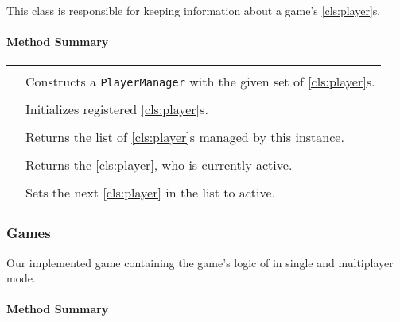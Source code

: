 \pagebreak

This class is responsible for keeping information about a game's \ref{cls:player}s.  \\

\centerdash

\paragraph*{Method Summary}
\paragraph*{}
\begin{longtable}{Lp{10cm}}
	\startmethodtable
	 \\
	& Constructs a \texttt{PlayerManager} with the given set of \ref{cls:player}s. \\
	 \\
	& Initializes registered \ref{cls:player}s. \\
	 \\
	& Returns the list of \ref{cls:player}s managed by this instance. \\
	 \\
	& Returns the \ref{cls:player}, who is currently active. \\
	 \\
	& Sets the next \ref{cls:player} in the list to active. \\
	\hline
\end{longtable}

\pagebreak

\subsubsection{Games}

Our implemented game containing the game's logic of \graphcoloring in single and multiplayer mode. \\

\centerdash

\paragraph*{Method Summary}
